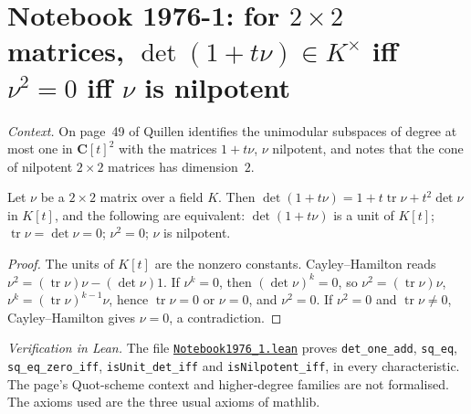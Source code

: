 \section[Notebook 1976-1: $\det(1 + t\nu)$ a unit iff $\nu^2 = 0$]{Notebook 1976-1: for $2 \times 2$ matrices, $\det(1 + t\nu) \in K^\times$ iff $\nu^2 = 0$ iff $\nu$ is nilpotent\protect{}}\label{sec:quillen-1976-1}

\emph{Context.} On page~49 of  Quillen identifies the unimodular subspaces of degree at most one in $\mathbf C[t]^2$ with the matrices $1 + t\nu$, $\nu$ nilpotent, and notes that the cone of nilpotent $2 \times 2$ matrices has dimension~$2$.

\begin{encadre}
\begin{theoreme}\label{thm:quillen-1976-1}
Let $\nu$ be a $2 \times 2$ matrix over a field $K$. Then $\det(1 + t\nu) = 1 + t\operatorname{tr}\nu + t^2\det\nu$ in $K[t]$, and the following are equivalent: $\det(1 + t\nu)$ is a unit of $K[t]$; $\operatorname{tr}\nu = \det\nu = 0$; $\nu^2 = 0$; $\nu$ is nilpotent.
\end{theoreme}
\end{encadre}

\begin{proof}
The units of $K[t]$ are the nonzero constants. Cayley--Hamilton reads $\nu^2 = (\operatorname{tr}\nu)\nu - (\det\nu)1$. If $\nu^k = 0$, then $(\det\nu)^k = 0$, so $\nu^2 = (\operatorname{tr}\nu)\nu$, $\nu^k = (\operatorname{tr}\nu)^{k-1}\nu$, hence $\operatorname{tr}\nu = 0$ or $\nu = 0$, and $\nu^2 = 0$. If $\nu^2 = 0$ and $\operatorname{tr}\nu \ne 0$, Cayley--Hamilton gives $\nu = 0$, a contradiction.
\end{proof}

\emph{Verification in Lean.} The file \href{\leanblobmain/Notebook1976_1.lean}{\texttt{Notebook1976\_1.\allowbreak{}lean}} proves \texttt{det\_one\_add}, \texttt{sq\_eq}, \texttt{sq\_eq\_zero\_iff}, \texttt{isUnit\_det\_iff} and \texttt{isNilpotent\_iff}, in every characteristic. The page's Quot-scheme context and higher-degree families are not formalised. The axioms used are the three usual axioms of mathlib.

